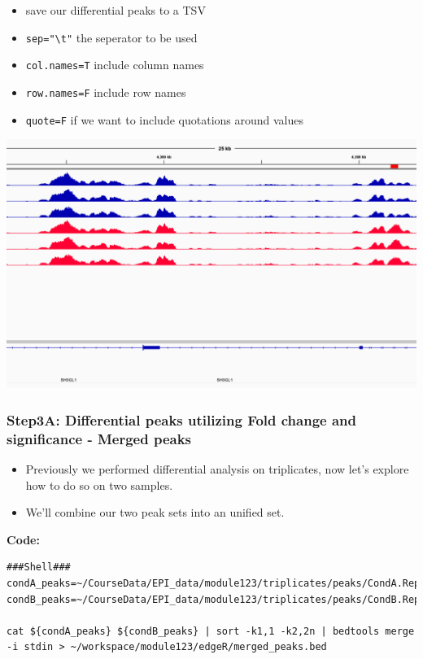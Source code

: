 \documentclass[
]{book}
\providecommand{\tightlist}{%
  \setlength{\itemsep}{0pt}\setlength{\parskip}{0pt}}
\begin{document}
\begin{itemize}
  \begin{itemize}
  \tightlist
  \item
    save our differential peaks to a TSV
  \item
    \texttt{sep="\textbackslash{}t"} the seperator to be used
  \item
    \texttt{col.names=T} include column names
  \item
    \texttt{row.names=F} include row names
  \item
    \texttt{quote=F} if we want to include quotations around values
  \end{itemize}
\end{itemize}

\includegraphics{./img/diffBind.png}

\subsubsection{Step3A: Differential peaks utilizing Fold change and significance - Merged peaks}\label{step3a-differential-peaks-utilizing-fold-change-and-significance---merged-peaks}

\begin{itemize}
\tightlist
\item
  Previously we performed differential analysis on triplicates, now let's explore how to do so on two samples.
\item
  We'll combine our two peak sets into an unified set.
\end{itemize}

\textbf{Code:}

\begin{verbatim}
###Shell###
condA_peaks=~/CourseData/EPI_data/module123/triplicates/peaks/CondA.Rep1_peaks.narrowPeak
condB_peaks=~/CourseData/EPI_data/module123/triplicates/peaks/CondB.Rep1_peaks.narrowPeak

cat ${condA_peaks} ${condB_peaks} | sort -k1,1 -k2,2n | bedtools merge -i stdin > ~/workspace/module123/edgeR/merged_peaks.bed
\end{verbatim}
\end{document}
